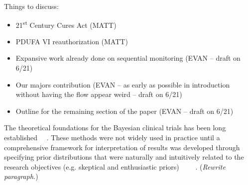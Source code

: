 \documentclass[12pt]{article}
\begin{document}
Things to discuss:
\begin{itemize}
 \item 21\textsuperscript{st} Century Cures Act (MATT)
 \item PDUFA VI reauthorization (MATT)
 \item Expansive work already done on sequential monitoring  (EVAN -- draft on 6/21)
 \item Our majors contribution (EVAN -- as early as possible in introduction without having the flow appear weird -- draft on 6/21)
 \item Outline for the remaining section of the paper (EVAN -- draft on 6/21)
\end{itemize}

The theoretical foundations for the Bayesian clinical trials has been long established \cite{Cornfield1966}~\cite{Cornfield1966a}~\cite{Neyman1967}. These methods were not widely used in practice until a comprehensive framework for interpretation of results was developed through specifying prior distributions that were naturally and intuitively related to the research objectives (e.g. skeptical and enthusiastic priors) \cite{Freedman1989}~\cite{Freedman1992}~\cite{Spiegelhalter1993}~\cite{Spiegelhalter1994}~\cite{Fayers1997}. (\textit{Rewrite paragraph.})
\end{document}
